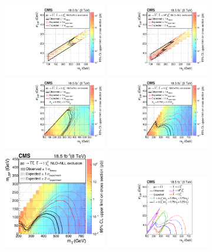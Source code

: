\begin{figure}[htbp]
\centering
      \includegraphics[width=0.40\textwidth]{Figure_002-a.pdf}
      \includegraphics[width=0.40\textwidth]{Figure_002-b.pdf}
      \includegraphics[width=0.40\textwidth]{Figure_002-c.pdf}
      \includegraphics[width=0.40\textwidth]{Figure_002-d.pdf}
      \includegraphics[width=0.40\textwidth]{Figure_002-e.pdf}
      \includegraphics[width=0.40\textwidth]{Figure_002-f.pdf}

\end{figure}
